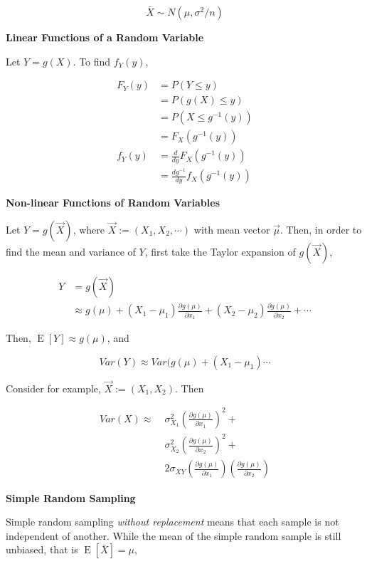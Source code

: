 \documentclass[a4paper]{article}
\newcommand{\subheading}[1]{{\scriptsize\textbf{#1}}}
\newcommand{\expectation}[1]{\operatorname{E}[#1]}
\begin{document}
\begin{multicols*}{4}
$$\bar{X} \sim N(\mu, \sigma^2/n)$$

\subheading{Linear Functions of a Random Variable}

Let $Y = g(X)$. To find $f_Y(y)$,

\begin{align*}
  F_Y(y) &= P(Y \leq y) \\
    &= P(g(X) \leq y) \\
    &= P(X \leq g^{-1}(y)) \\
    &= F_X(g^{-1}(y)) \\
  f_Y(y) &= \frac{d}{dy} F_X(g^{-1}(y)) \\
    &= \frac{dg^{-1}}{dy} f_X(g^{-1}(y))
\end{align*}

\subheading{Non-linear Functions of Random Variables}

Let $Y = g(\vec{X})$, where $\vec{X} := (X_1, X_2, \cdots)$ with mean vector
$\vec{\mu}$. Then, in order to find the mean and variance of $Y$, first take the
Taylor expansion of $g(\vec{X})$,

\begin{align*}
  Y &= g(\vec{X}) \\
    &\approx
      g(\mu) +
      (X_1 - \mu_1)\frac{\partial g(\mu)}{\partial x_1} +
      (X_2 - \mu_2)\frac{\partial g(\mu)}{\partial x_2} + \cdots
\end{align*}

Then, $\expectation{Y} \approx g(\mu)$, and 

$$Var(Y) \approx Var(g(\mu) + (X_1 - \mu_1)\cdots$$

Consider for example, $\vec{X} := (X_1, X_2)$. Then

\begin{align*}
Var(X) \approx\;
  &\sigma^2_{X_1} \left ( \frac{\partial g(\mu)}{\partial x_1} \right )^2 + \\
  &\sigma^2_{X_2} \left ( \frac{\partial g(\mu)}{\partial x_2} \right )^2 + \\
  &2\sigma_{XY} \left ( \frac{\partial g(\mu)}{\partial x_1} \right )
  \left ( \frac{\partial g(\mu)}{\partial x_2} \right )
\end{align*}

\subheading{Simple Random Sampling}

Simple random sampling \textit{without replacement} means that each sample is
not independent of another. While the mean of the simple random sample is still
unbiased, that is $\expectation{\bar{X}} = \mu$,


\end{multicols*}
\end{document}
